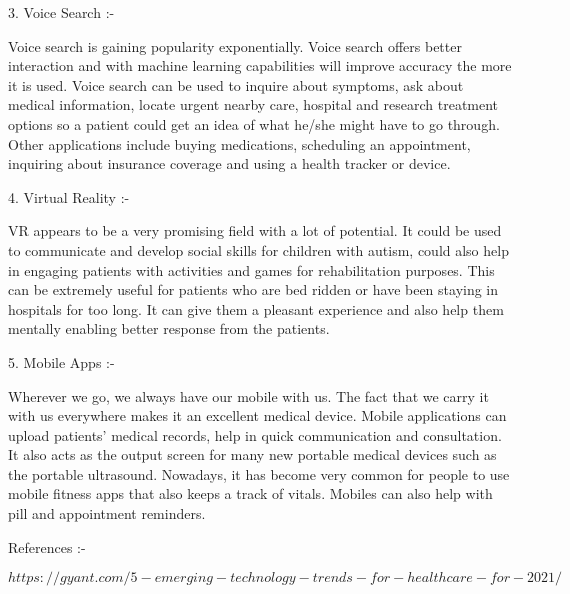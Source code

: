 \documentclass[12pt]{article}
\begin{document}
\begin{large}
\begin{Large}
3. Voice Search :-
\end{Large}
\linebreak
Voice search is gaining popularity exponentially. Voice search offers better interaction and with machine learning capabilities will improve accuracy the more it is used. Voice search can be used to inquire about symptoms, ask about medical information, locate urgent nearby care, hospital and research treatment options so a patient could get an idea of what he/she might have to go through. Other applications include buying medications, scheduling an appointment, inquiring about insurance coverage and using a health tracker or device.
\linebreak


\begin{Large}
4. Virtual Reality :-
\end{Large}
\linebreak
VR appears to be a very promising field with a lot of potential. It could be used to communicate and develop social skills for children with autism, could also help in engaging patients with activities and games for rehabilitation purposes. This can be extremely useful for patients who are bed ridden or have been staying in hospitals for too long. It can give them a pleasant experience and also help them mentally enabling better response from the patients.
\linebreak


\begin{Large}
5. Mobile Apps :-
\end{Large}
\linebreak
Wherever we go, we always have our mobile with us. The fact that we carry it with us everywhere makes it an excellent medical device. Mobile applications can upload patients' medical records, help in quick communication and consultation. It also acts as the output screen for many new portable medical devices such as the portable ultrasound. Nowadays, it has become very common for people to use mobile fitness apps that also keeps a track of vitals. Mobiles can also help with pill and appointment reminders.
\linebreak
\linebreak

\begin{Large}
References :-
\end{Large}
\linebreak
\linebreak
$https://gyant.com/5-emerging-technology-trends-for-healthcare-for-2021/$

\end{large}
\end{document}
